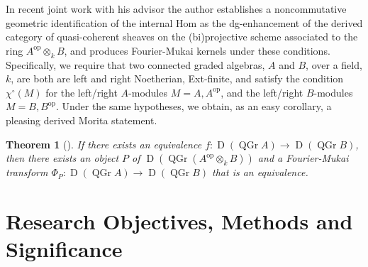 \documentclass[11pt]{article}
\newtheorem{theorem}{Theorem}[section]
\begin{document}
In recent joint work with his advisor \cite{BF17} the author establishes a noncommutative geometric identification of the internal Hom as the dg-enhancement of the derived category of quasi-coherent sheaves on the (bi)projective scheme associated to the ring $A^{\operatorname{op}} \otimes_k B$, and produces Fourier-Mukai kernels under these conditions.
Specifically, we require that two connected graded algebras, $A$ and $B$, over a field, $k$, are both are left and right Noetherian, Ext-finite, and satisfy the condition $\chi^\circ(M)$ for the left/right $A$-modules $M = A, A^{\operatorname{op}}$, and the left/right $B$-modules $M = B, B^{\operatorname{op}}$.
Under the same hypotheses, we obtain, as an easy corollary, a pleasing derived Morita statement.
\begin{theorem}[\cite{BF17}]
  If there exists an equivalence
  $f \colon \operatorname{D}(\operatorname{QGr} A) \to \operatorname{D}(\operatorname{QGr} B)$,
  then there exists an object $P$ of $\operatorname{D}\left(\operatorname{QGr} \left(A^{\operatorname{op}} \otimes_k B\right)\right)$ and a Fourier-Mukai transform
  $\Phi_P \colon \operatorname{D}(\operatorname{QGr} A) \to \operatorname{D}(\operatorname{QGr} B)$
  that is an equivalence.
\end{theorem}



\section{Research Objectives, Methods and Significance}
\end{document}

